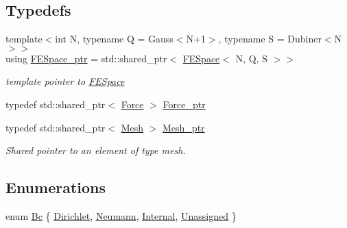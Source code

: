\subsection*{Typedefs}
\begin{DoxyCompactItemize}
\item 
{\footnotesize template$<$int N, typename Q  = Gauss$<$\-N+1$>$, typename S  = Dubiner$<$\-N$>$$>$ }\\using \hyperlink{namespaceTspeed_a05fcb57094666c8f5ab1e90d1a6fecf8}{F\-E\-Space\-\_\-ptr} = std\-::shared\-\_\-ptr$<$ \hyperlink{classTspeed_1_1FESpace}{F\-E\-Space}$<$ N, Q, S $>$$>$
\begin{DoxyCompactList}\small\item\em template pointer to \hyperlink{classTspeed_1_1FESpace}{F\-E\-Space} \end{DoxyCompactList}\item 
typedef std\-::shared\-\_\-ptr$<$ \hyperlink{classTspeed_1_1Force}{Force} $>$ \hyperlink{namespaceTspeed_a3795c740b127fc84de9d80cc919dd4d1}{Force\-\_\-ptr}
\item 
typedef std\-::shared\-\_\-ptr$<$ \hyperlink{classTspeed_1_1Mesh}{Mesh} $>$ \hyperlink{namespaceTspeed_a7367a01365c4cc2c1a09305b3effc4e8}{Mesh\-\_\-ptr}
\begin{DoxyCompactList}\small\item\em Shared pointer to an element of type mesh. \end{DoxyCompactList}\end{DoxyCompactItemize}
\subsection*{Enumerations}
\begin{DoxyCompactItemize}
\item 
enum \hyperlink{namespaceTspeed_a301e5218199485c06d62434c719ea5e0}{Bc} \{ \hyperlink{namespaceTspeed_a301e5218199485c06d62434c719ea5e0abac152b762896edff34ed668ae1a546f}{Dirichlet}, 
\hyperlink{namespaceTspeed_a301e5218199485c06d62434c719ea5e0ab8537a769dbc90cb1762215441212152}{Neumann}, 
\hyperlink{namespaceTspeed_a301e5218199485c06d62434c719ea5e0aafbf0897a5a83fdd873dfb032ec695d3}{Internal}, 
\hyperlink{namespaceTspeed_a301e5218199485c06d62434c719ea5e0a3476bf9c3af766198bfbd4f065a51e69}{Unassigned}
 \}
\end{DoxyCompactItemize}
